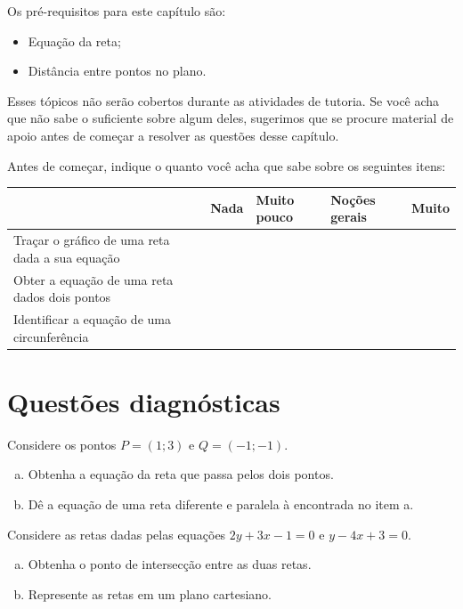 \documentclass[main.tex]{subfiles}
\begin{document}
Os pré-requisitos para este capítulo são:
\begin{itemize}
 \item Equação da reta;
 \item Distância entre pontos no plano.
\end{itemize}

Esses tópicos não serão cobertos durante as atividades de tutoria. Se você acha que não sabe o suficiente sobre algum deles, sugerimos que se procure material de apoio antes de começar a resolver as questões desse capítulo.

Antes de começar, indique o quanto você acha que sabe sobre os seguintes itens:

\begin{center}
 \begin{tabular}{|p{25mm}||p{10mm}|p{10mm}|p{10mm}|p{10mm}|} 
 \hline
   & Nada & Muito pouco & Noções gerais & Muito\\
 \hline
 Traçar o gráfico de uma reta dada a sua equação &  &  &  &  \\ 
 \hline
 Obter a equação de uma reta dados dois pontos &  &  &  &  \\
 \hline
 Identificar a equação de uma circunferência &  &  &  &  \\
 \hline
\end{tabular}
\end{center}

\paraAmbos

\section{Questões diagnósticas}

\begin{diagnostico}
Considere os pontos $P=(1;3)$ e $Q=(-1;-1)$.
\begin{enumerate}[a)]
\item Obtenha a equação da reta que passa pelos dois pontos.
\item Dê a equação de uma reta diferente e paralela à encontrada no item a.
\end{enumerate}
\end{diagnostico}

\begin{diagnostico}
Considere as retas dadas pelas equações $2y+3x-1=0$ e $y-4x+3=0$.
\begin{enumerate}[a)]
\item Obtenha o ponto de intersecção entre as duas retas.
\item Represente as retas em um plano cartesiano.
\end{enumerate}
\end{diagnostico}
\end{document}
